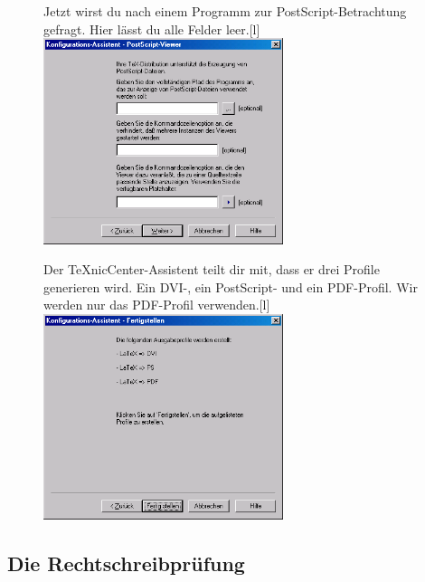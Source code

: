 \begin{figure}[ht]
	\begin{captionbeside}{Jetzt wirst du nach einem Programm zur PostScript-Betrachtung gefragt. Hier lässt du alle Felder leer.}[l]
		\includegraphics[width=7cm]{images/konfiguration03.png}
	\end{captionbeside}
	\label{fig:konfiguration03}
\end{figure}

\begin{figure}[ht]
	\begin{captionbeside}{Der TeXnicCenter-Assistent teilt dir mit, dass er drei Profile generieren wird. Ein DVI-, ein PostScript- und ein PDF-Profil. Wir werden nur das PDF-Profil verwenden.}[l]
		\includegraphics[width=7cm]{images/konfiguration04.png}
	\end{captionbeside}
	\label{fig:konfiguration04}
\end{figure}

\clearpage %

\subsection{Die Rechtschreibprüfung}

